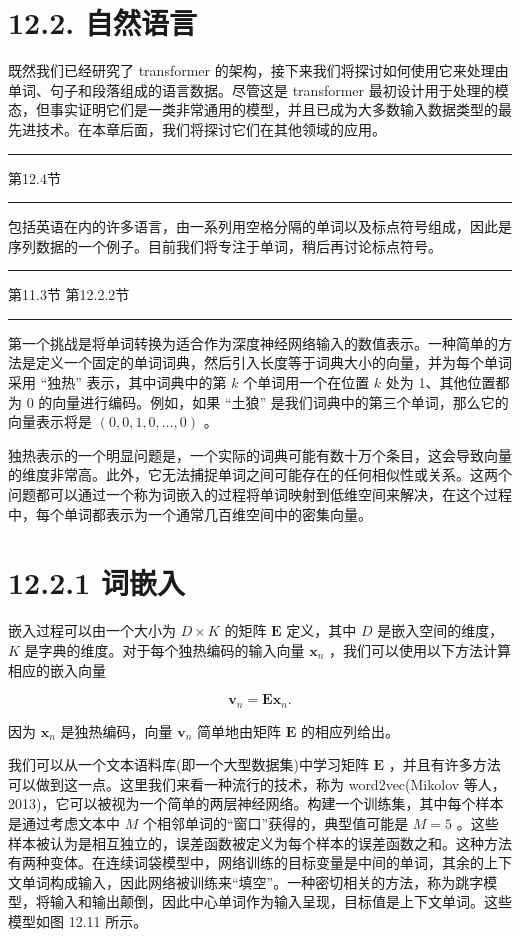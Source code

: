 \documentclass[10pt]{report}
\newcommand{\HRule}{\begin{center}\rule{0.9\linewidth}{0.2mm}\end{center}}
\begin{document}
\section*{12.2. 自然语言}

既然我们已经研究了 transformer 的架构，接下来我们将探讨如何使用它来处理由单词、句子和段落组成的语言数据。尽管这是 transformer 最初设计用于处理的模态，但事实证明它们是一类非常通用的模型，并且已成为大多数输入数据类型的最先进技术。在本章后面，我们将探讨它们在其他领域的应用。

\HRule

第12.4节

\HRule

包括英语在内的许多语言，由一系列用空格分隔的单词以及标点符号组成，因此是序列数据的一个例子。目前我们将专注于单词，稍后再讨论标点符号。

\HRule

第11.3节 第12.2.2节

\HRule

第一个挑战是将单词转换为适合作为深度神经网络输入的数值表示。一种简单的方法是定义一个固定的单词词典，然后引入长度等于词典大小的向量，并为每个单词采用 “独热” 表示，其中词典中的第 \(k\) 个单词用一个在位置 \(k\) 处为 1、其他位置都为 0 的向量进行编码。例如，如果 “土狼” 是我们词典中的第三个单词，那么它的向量表示将是 \(\left( {0,0,1,0,\ldots ,0}\right)\) 。

独热表示的一个明显问题是，一个实际的词典可能有数十万个条目，这会导致向量的维度非常高。此外，它无法捕捉单词之间可能存在的任何相似性或关系。这两个问题都可以通过一个称为词嵌入的过程将单词映射到低维空间来解决，在这个过程中，每个单词都表示为一个通常几百维空间中的密集向量。

\section*{12.2.1 词嵌入}

嵌入过程可以由一个大小为 \(D \times  K\) 的矩阵 \(\mathbf{E}\) 定义，其中 \(D\) 是嵌入空间的维度， \(K\) 是字典的维度。对于每个独热编码的输入向量 \({\mathbf{x}}_{n}\) ，我们可以使用以下方法计算相应的嵌入向量

\[
{\mathbf{v}}_{n} = \mathbf{E}{\mathbf{x}}_{n}. \tag{12.26}
\]

因为 \({\mathbf{x}}_{n}\) 是独热编码，向量 \({\mathbf{v}}_{n}\) 简单地由矩阵 \(\mathbf{E}\) 的相应列给出。

我们可以从一个文本语料库(即一个大型数据集)中学习矩阵 \(\mathbf{E}\) ，并且有许多方法可以做到这一点。这里我们来看一种流行的技术，称为 word2vec(Mikolov 等人，2013)，它可以被视为一个简单的两层神经网络。构建一个训练集，其中每个样本是通过考虑文本中 \(M\) 个相邻单词的“窗口”获得的，典型值可能是 \(M = 5\) 。这些样本被认为是相互独立的，误差函数被定义为每个样本的误差函数之和。这种方法有两种变体。在连续词袋模型中，网络训练的目标变量是中间的单词，其余的上下文单词构成输入，因此网络被训练来“填空”。一种密切相关的方法，称为跳字模型，将输入和输出颠倒，因此中心单词作为输入呈现，目标值是上下文单词。这些模型如图 12.11 所示。
\end{document}
